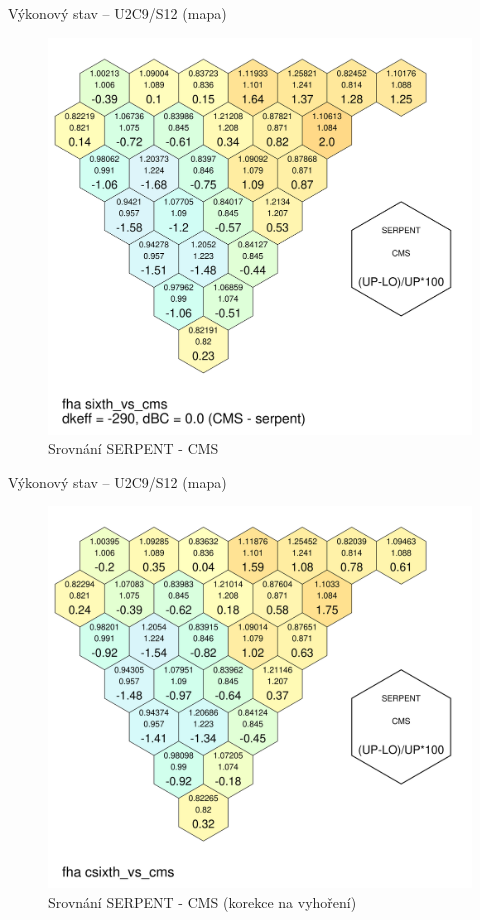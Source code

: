 \documentclass{beamer}
\begin{document}
\begin{frame}{Výkonový stav -- U2C9/S12 (mapa)}
	\begin{figure}[!h]
		\centering
		\includegraphics[scale=0.13]{img/fha_sixth_vs_cms.pdf}
		\caption{\footnotesize Srovnání SERPENT - CMS}
	\end{figure}
\end{frame}

\begin{frame}{Výkonový stav -- U2C9/S12 (mapa)}
	\begin{figure}[!h]
		\centering
		\includegraphics[scale=0.13]{img/fha_csixth_vs_cms.pdf}
		\caption{\footnotesize Srovnání SERPENT - CMS (korekce na vyhoření)}
	\end{figure}
\end{frame}
\end{document}
